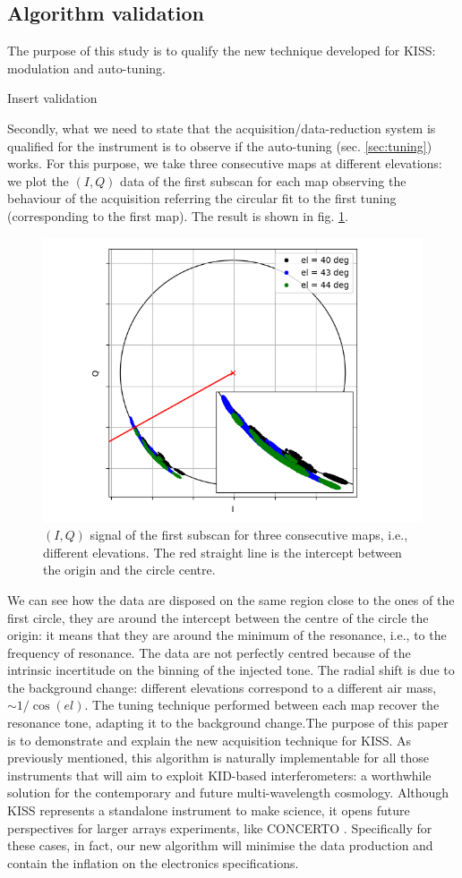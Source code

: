 \documentclass[twocolumn,traditabstract]{aa}\\
\begin{document}
\subsection{Algorithm validation}
The purpose of this study is to qualify the new technique developed for KISS: modulation and auto-tuning.

Insert validation

Secondly, what we need to state that the acquisition/data-reduction system is qualified for the instrument is to observe if the auto-tuning (sec. \ref{sec:tuning}) works. For this purpose, we take three consecutive maps at different elevations: we plot the $(I,Q)$ data of the first subscan for each map observing the behaviour of the acquisition referring the circular fit to the first tuning (corresponding to the first map). The result is shown in fig. \ref{fig:autotuning}.

\begin{figure}[htf]
	\centering
	\includegraphics[width=.5\textwidth]{4.results/autotuning.png}
	\caption{$(I,Q)$ signal of the first subscan for three consecutive maps, i.e., different elevations. The red straight line is the intercept between the origin and the circle centre.}
	\label{fig:autotuning}
\end{figure}

\noindent We can see how the data are disposed on the same region close to the ones of the first circle, they are around the intercept between the centre of the circle the origin: it means that they are around the minimum of the resonance, i.e., to the frequency of resonance. The data are not perfectly centred because of the intrinsic incertitude on the binning of the injected tone. The radial shift is due to the background change: different elevations correspond to a different air mass, $\sim 1/\cos(el)$. The tuning technique performed between each map recover the resonance  tone, adapting it to the background change.The purpose of this paper is to demonstrate and explain the new acquisition technique for KISS. As previously mentioned, this algorithm is naturally implementable for all those instruments that will aim to exploit KID-based interferometers: a worthwhile solution for the contemporary and future multi-wavelength cosmology. Although KISS represents a standalone instrument to make science, it opens future perspectives for larger arrays experiments, like CONCERTO \cite{concerto}. Specifically for these cases, in fact, our new algorithm will minimise the data production and contain the inflation on the electronics specifications.
\end{document}

